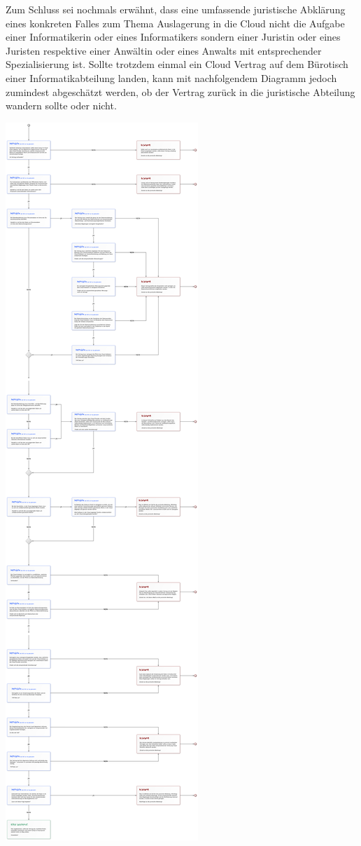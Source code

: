 \documentclass[a4paper,pointlessnumbers]{scrreprt}
\begin{document}
Zum Schluss sei nochmals erwähnt, dass eine umfassende juristische Abklärung eines konkreten Falles zum Thema Auslagerung in die Cloud nicht die Aufgabe einer Informatikerin oder eines Informatikers sondern einer Juristin oder eines Juristen respektive einer Anwältin oder eines Anwalts mit entsprechender Spezialisierung ist. Sollte trotzdem einmal ein Cloud Vertrag auf dem Bürotisch einer Informatikabteilung landen, kann mit nachfolgendem Diagramm jedoch zumindest abgeschätzt werden, ob der Vertrag zurück in die juristische Abteilung wandern sollte oder nicht.

\begin{center}
\includegraphics[width=\textwidth]{images/flussdiagramm01.pdf}

\end{center}
\end{document}
